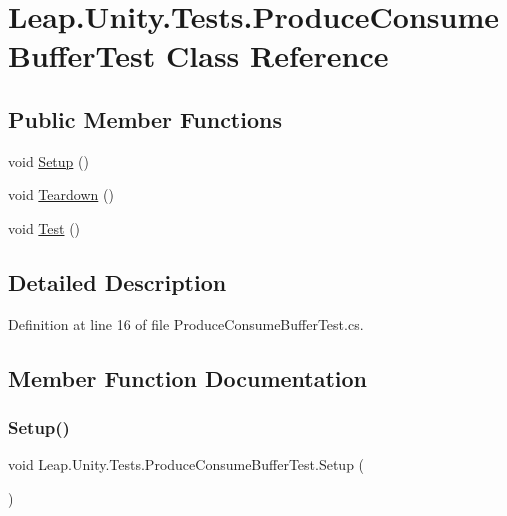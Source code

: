 \hypertarget{class_leap_1_1_unity_1_1_tests_1_1_produce_consume_buffer_test}{}\section{Leap.\+Unity.\+Tests.\+Produce\+Consume\+Buffer\+Test Class Reference}
\label{class_leap_1_1_unity_1_1_tests_1_1_produce_consume_buffer_test}
\subsection*{Public Member Functions}
\begin{DoxyCompactItemize}
\item 
void \mbox{\hyperlink{class_leap_1_1_unity_1_1_tests_1_1_produce_consume_buffer_test_a1d025f640bb90724d29269300a2ec3db}{Setup}} ()
\item 
void \mbox{\hyperlink{class_leap_1_1_unity_1_1_tests_1_1_produce_consume_buffer_test_a77c36eff139f3ba073d541663528b808}{Teardown}} ()
\item 
void \mbox{\hyperlink{class_leap_1_1_unity_1_1_tests_1_1_produce_consume_buffer_test_a3e45e3a47fd7e880a5ab1cbf7b8a57b7}{Test}} ()
\end{DoxyCompactItemize}


\subsection{Detailed Description}


Definition at line 16 of file Produce\+Consume\+Buffer\+Test.\+cs.



\subsection{Member Function Documentation}
\mbox{\label{class_leap_1_1_unity_1_1_tests_1_1_produce_consume_buffer_test_a1d025f640bb90724d29269300a2ec3db}} 
\subsubsection{\texorpdfstring{Setup()}{Setup()}}
{\footnotesize\ttfamily void Leap.\+Unity.\+Tests.\+Produce\+Consume\+Buffer\+Test.\+Setup (\begin{DoxyParamCaption}{ }\end{DoxyParamCaption})}



